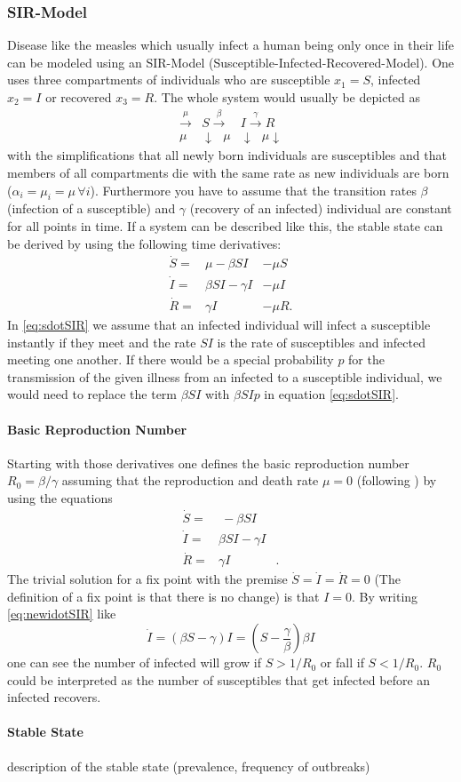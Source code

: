 \subsubsection{SIR-Model}
Disease like the measles which usually infect a human being only once in their life can be modeled using an SIR-Model (Susceptible-Infected-Recovered-Model). One uses three compartments of individuals who are susceptible $x_1 = S$, infected $x_2=I$ or recovered $x_3=R$. The whole system would usually be depicted as 
\begin{eqnarray}
\xrightarrow{\mu} &S \xrightarrow{\beta} &I  \xrightarrow{\gamma} R  \\
{\mu} & \downarrow \text{         }\mu &\downarrow \text{  } {\mu} \downarrow \nonumber
\end{eqnarray}
with the simplifications that all newly born individuals are susceptibles and that members of all compartments die with the same rate as new individuals are born ($\alpha_i = \mu_i = \mu\, \forall i$). Furthermore you have to assume that the transition rates $\beta$ (infection of a susceptible) and $\gamma$ (recovery of an infected) individual are constant for all points in time.
If a system can be described like this, the stable state can be derived by using the following time derivatives:
\begin{eqnarray}
\dot{S} =& \mu -\beta SI &-  \mu S  \label{eq:sdotSIR}\\ 
\dot{I} =& \beta SI - \gamma I  &-\mu I \\
\dot{R} =& \gamma I & -\mu R.
\end{eqnarray}
In \ref{eq:sdotSIR} we assume that an infected individual will infect a susceptible instantly if they meet and the rate $SI$ is the rate of susceptibles and infected meeting one another. If there would be a special probability $p$ for the transmission of the given illness from an infected to a susceptible individual, we would need to replace the term $\beta SI$ with $\beta S I p$ in equation \ref{eq:sdotSIR}.
\paragraph{Basic Reproduction Number}
Starting with those derivatives one defines the basic reproduction number $R_0=\beta / \gamma$ assuming that the reproduction and death rate $\mu=0$ (following \citep{AND92}) by using the equations
\begin{eqnarray}
\dot{S} =& \ -\beta SI &  \label{eq:newsdotSIR}\\ 
\dot{I} =& \beta SI - \gamma I  & \label{eq:newidotSIR}\\
\dot{R} =& \gamma I &.
\end{eqnarray}
The trivial solution for a fix point with the premise $\dot{S} = \dot{I} =\dot{R} = 0$ (The definition of a fix point is that there is no change) is that $I=0$. By writing \ref{eq:newidotSIR} like 
\begin{equation}
\dot{I} = (\beta S -\gamma) I = \left( S-\frac{\gamma}{\beta} \right) \beta I
\end{equation}
one can see the number of infected will grow if $S > 1/R_0$ or fall if $S < 1/R_0$. $R_0$ could be interpreted as the number of susceptibles that get infected before an infected recovers.
\paragraph{Stable State}
description of the stable state (prevalence, frequency of outbreaks)